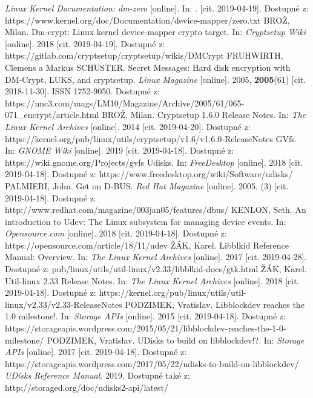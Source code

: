 \documentclass[a4paper,12pt]{article}
\begin{document}
{
\textit{Linux Kernel Documentation: dm-zero} [online]. In: . [cit. 2019-04-19]. Dostupné z: https://www.kernel.org/doc/Documentation/device-mapper/zero.txt
BROŽ, Milan. Dm-crypt: Linux kernel device-mapper crypto target. In: \textit{Cryptsetup Wiki} [online]. 2018 [cit. 2019-04-19]. Dostupné z: https://gitlab.com/cryptsetup/cryptsetup/wikis/DMCrypt
FRUHWIRTH, Clemens a Markus SCHUSTER. Secret Messages: Hard disk encryption with DM-Crypt, LUKS, and cryptsetup. \textit{Linux Magazine} [online]. 2005, \textbf{2005}(61) [cit. 2018-11-30]. ISSN 1752-9050. Dostupné z: https://nnc3.com/mags/LM10/Magazine/Archive/2005/61/065-071\_encrypt/article.html
BROŽ, Milan. Cryptsetup 1.6.0 Release Notes. In: \textit{The Linux Kernel Archives} [online]. 2014 [cit. 2019-04-20]. Dostupné z: https://kernel.org/pub/linux/utils/cryptsetup/v1.6/v1.6.0-ReleaseNotes
GVfs. In: \textit{GNOME Wiki} [online]. 2019 [cit. 2019-04-18]. Dostupné z: https://wiki.gnome.org/Projects/gvfs
Udisks. In: \textit{FreeDesktop} [online]. 2018 [cit. 2019-04-18]. Dostupné z: https://www.freedesktop.org/wiki/Software/udisks/
PALMIERI, John. Get on D-BUS. \textit{Red Hat Magazine} [online]. 2005, (3) [cit. 2019-04-18]. Dostupné z: http://www.redhat.com/magazine/003jan05/features/dbus/
KENLON, Seth. An introduction to Udev: The Linux subsystem for managing device events. In: \textit{Opensource.com} [online]. 2018 [cit. 2019-04-18]. Dostupné z: https://opensource.com/article/18/11/udev
ŽÁK, Karel. Libblkid Reference Manual: Overview. In: \textit{The Linux Kernel Archives} [online]. 2017 [cit. 2019-04-28]. Dostupné z: pub/linux/utils/util-linux/v2.33/libblkid-docs/gtk.html
ŽÁK, Karel. Util-linux 2.33 Release Notes. In: \textit{The Linux Kernel Archives} [online]. 2018 [cit. 2019-04-18]. Dostupné z: https://kernel.org/pub/linux/utils/util-linux/v2.33/v2.33-ReleaseNotes
PODZIMEK, Vratislav. Libblockdev reaches the 1.0 milestone!. In: \textit{Storage APIs} [online]. 2015 [cit. 2019-04-18]. Dostupné z: https://storageapis.wordpress.com/2015/05/21/libblockdev-reaches-the-1-0-milestone/
PODZIMEK, Vratislav. UDisks to build on libblockdev!?. In: \textit{Storage APIs} [online]. 2017 [cit. 2019-04-18]. Dostupné z: https://storageapis.wordpress.com/2017/05/22/udisks-to-build-on-libblockdev/
\textit{UDisks Reference Manual}. 2019. Dostupné také z: http://storaged.org/doc/udisks2-api/latest/
}
\end{document}
